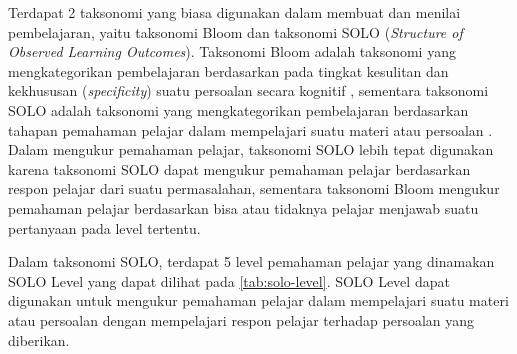 Terdapat 2 taksonomi yang biasa digunakan dalam membuat dan menilai pembelajaran, yaitu taksonomi Bloom dan taksonomi SOLO (\textit{Structure of Observed Learning Outcomes}). Taksonomi Bloom adalah taksonomi yang mengkategorikan pembelajaran berdasarkan pada tingkat kesulitan dan kekhususan (\textit{specificity}) suatu persoalan secara kognitif \parencite{woolfolk2016educational}, sementara taksonomi SOLO adalah taksonomi yang mengkategorikan pembelajaran berdasarkan tahapan pemahaman pelajar dalam mempelajari suatu materi atau persoalan \parencite{biggs2014evaluating}. Dalam mengukur pemahaman pelajar, taksonomi SOLO lebih tepat digunakan karena taksonomi SOLO dapat mengukur pemahaman pelajar berdasarkan respon pelajar dari suatu permasalahan, sementara taksonomi Bloom mengukur pemahaman pelajar berdasarkan bisa atau tidaknya pelajar menjawab suatu pertanyaan pada level tertentu.

Dalam taksonomi SOLO, terdapat 5 level pemahaman pelajar \parencite{biggs2014evaluating} yang dinamakan SOLO Level yang dapat dilihat pada \autoref{tab:solo-level}. SOLO Level dapat digunakan untuk mengukur pemahaman pelajar dalam mempelajari suatu materi atau persoalan dengan mempelajari respon pelajar terhadap persoalan yang diberikan.

